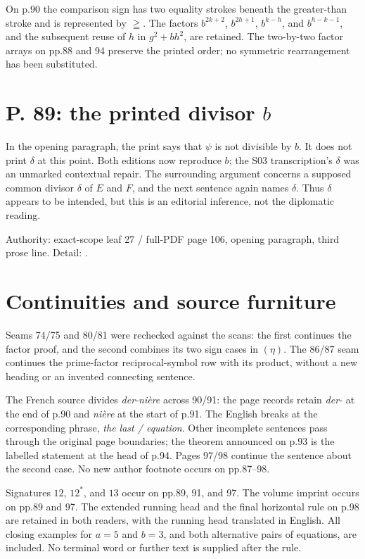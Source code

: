 \documentclass[11pt]{article}
\begin{document}
On p.90 the comparison sign has two equality strokes beneath the greater-than
stroke and is represented by $\geqq$. The factors $b^{2k+2}$, $b^{2h+1}$,
$b^{k-h}$, and $b^{h-k-1}$, and the subsequent reuse of $h$ in $g^2+bh^2$,
are retained. The two-by-two factor arrays on pp.88 and 94 preserve the printed
order; no symmetric rearrangement has been substituted.

\section*{P. 89: the printed divisor $b$}
In the opening paragraph, the print says that $\psi$ is not divisible by $b$.
It does not print $\delta$ at this point. Both editions now reproduce $b$;
the S03 transcription's $\delta$ was an unmarked contextual repair.
The surrounding argument concerns a supposed common divisor $\delta$ of
$E$ and $F$, and the next sentence again names $\delta$. Thus $\delta$ appears
to be intended, but this is an editorial inference, not the diplomatic reading.

Authority: exact-scope leaf 27 / full-PDF page 106, opening paragraph,
third prose line. Detail: .

\section*{Continuities and source furniture}
Seams 74/75 and 80/81 were rechecked against the scans: the first continues the
factor proof, and the second combines its two sign cases in $(\eta)$.
The 86/87 seam continues the prime-factor reciprocal-symbol row with its
product, without a new heading or an invented connecting sentence.

The French source divides \emph{der-nière} across 90/91: the page records retain
\emph{der-} at the end of p.90 and \emph{nière} at the start of p.91. The English
breaks at the corresponding phrase, \emph{the last / equation}. Other incomplete
sentences pass through the original page boundaries; the theorem announced on
p.93 is the labelled statement at the head of p.94. Pages 97/98 continue the
sentence about the second case. No new author footnote occurs on pp.87–98.

Signatures $12$, $12^*$, and $13$ occur on pp.89, 91, and 97. The volume imprint
occurs on pp.89 and 97. The extended running head and the final horizontal rule
on p.98 are retained in both readers, with the running head translated in English.
All closing examples for $a=5$ and $b=3$, and both alternative pairs of equations,
are included. No terminal word or further text is supplied after the rule.
\end{document}
